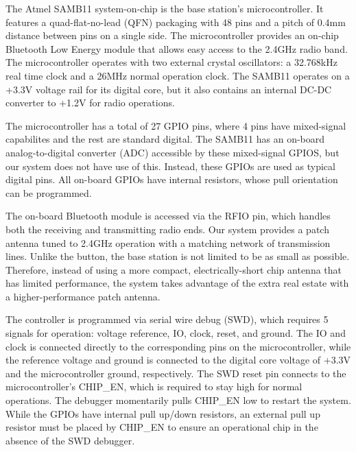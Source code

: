 \documentclass[journal,compsoc]{IEEEtran}
\begin{document}
The Atmel SAMB11 system-on-chip is the base station's microcontroller. It features a quad-flat-no-lead (QFN) packaging with 48 pins and a pitch of 0.4mm distance between pins on a single side. The microcontroller provides an on-chip Bluetooth Low Energy module that allows easy access to the 2.4GHz radio band. The microcontroller operates with two external crystal oscillators: a 32.768kHz real time clock and a 26MHz normal operation clock. The SAMB11 operates on a +3.3V voltage rail for its digital core, but it also contains an internal DC-DC converter to +1.2V for radio operations.

The microcontroller has a total of 27 GPIO pins, where 4 pins have mixed-signal capabilites and the rest are standard digital. The SAMB11 has an on-board analog-to-digital converter (ADC) accessible by these mixed-signal GPIOS, but our system does not have use of this. Instead, these GPIOs are used as typical digital pins. All on-board GPIOs have internal resistors, whose pull orientation can be programmed.

The on-board Bluetooth module is accessed via the RFIO pin, which handles both the receiving and transmitting radio ends. Our system provides a patch antenna tuned to 2.4GHz operation with a matching network of transmission lines. Unlike the button, the base station is not limited to be as small as possible. Therefore, instead of using a more compact, electrically-short chip antenna that has limited performance, the system takes advantage of the extra real estate with a higher-performance patch antenna.

The controller is programmed via serial wire debug (SWD), which requires 5 signals for operation: voltage reference, IO, clock, reset, and ground. The IO and clock is connected directly to the corresponding pins on the microcontroller, while the reference voltage and ground is connected to the digital core voltage of +3.3V and the microcontroller ground, respectively. The SWD reset pin connects to the microcontroller's CHIP\_EN, which is required to stay high for normal operations. The debugger momentarily pulls CHIP\_EN low to restart the system. While the GPIOs have internal pull up/down resistors, an external pull up resistor must be placed by CHIP\_EN to ensure an operational chip in the absence of the SWD debugger.
\end{document}
